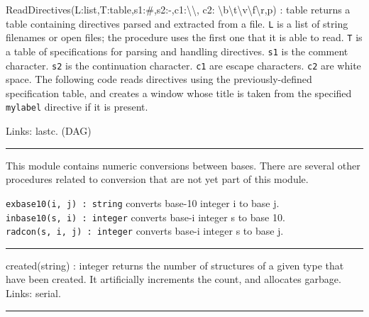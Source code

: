 \textsf{ReadDirectives(L:list,T:table,s1:{\textquotedbl}\#{\textquotedbl},s2:{\textquotedbl}-{\textquotedbl},c1:{\textquotesingle}{\textbackslash}{\textbackslash}{\textquotesingle},
c2:{\textquotesingle}
{\textbackslash}b{\textbackslash}t{\textbackslash}v{\textbackslash}f{\textbackslash}r{\textquotesingle},p)
: table} returns a table containing directives parsed and extracted
from a file. \texttt{L} is a list of string filenames or open files;
the procedure uses the first one that it is able to read. \texttt{T} is
a table of specifications for parsing and handling directives.
\texttt{s1} is the comment character. \texttt{s2} is the continuation
character. \texttt{c1} are escape characters. \texttt{c2} are white
space. The following code reads directives using the previously-defined
specification table, and creates a window whose title is taken from the
specified \texttt{mylabel} directive if it is present.


Links: lastc. (DAG)

\vspace{0.25cm}\hrule{}

This module contains numeric conversions between
bases. There are several other procedures related
to conversion that are not yet part of this module. 

\texttt{exbase10(i, j) : string} converts base-10 integer i to base
j.\\
\texttt{inbase10(s, i) : integer} converts base-i integer s to base
10.\\
\texttt{radcon(s, i, j) : integer} converts base-i integer s to base j.

\vspace{0.25cm}\hrule{}

\textsf{created(string) : integer} returns the number of structures of a
given type that have been created. It artificially increments the
count, and allocates garbage. Links: \textsf{serial}. 

\vspace{0.25cm}\hrule{}

